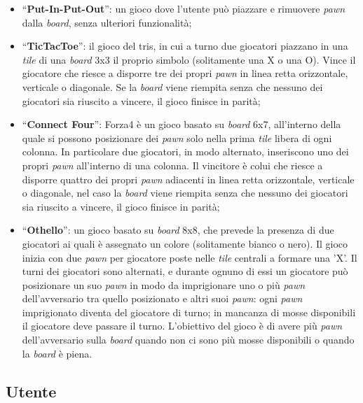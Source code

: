 \begin{itemize}
    \item ``\textbf{Put-In-Put-Out}'': un gioco dove l'utente può piazzare e rimuovere \textit{pawn} dalla \textit{board}, senza ulteriori funzionalità;
    \item ``\textbf{TicTacToe}'': il gioco del tris, in cui a turno due giocatori piazzano in una \textit{tile} di una \textit{board} 3x3 il proprio simbolo (solitamente una X o una O). Vince il giocatore che riesce a disporre tre dei propri \textit{pawn} in linea retta orizzontale, verticale o diagonale. Se la \textit{board} viene riempita senza che nessuno dei giocatori sia riuscito a vincere, il gioco finisce in parità;
    \item ``\textbf{Connect Four}'': Forza4 è un gioco basato su \textit{board} 6x7, all'interno della quale si possono posizionare dei \textit{pawn} solo nella prima \textit{tile} libera di ogni colonna. In particolare due giocatori, in modo alternato, inseriscono uno dei propri \textit{pawn} all'interno di una colonna. Il vincitore è colui che riesce a disporre quattro dei propri \textit{pawn} adiacenti in linea retta orizzontale, verticale o diagonale, nel caso la \textit{board} viene riempita senza che nessuno dei giocatori sia riuscito a vincere, il gioco finisce in parità;
    \item ``\textbf{Othello}'': un gioco basato su \textit{board} 8x8, che prevede la presenza di due giocatori ai quali è assegnato un colore (solitamente bianco o nero). Il gioco inizia con due \textit{pawn} per giocatore poste nelle \textit{tile} centrali a formare una 'X'. Il turni dei giocatori sono alternati, e durante ognuno di essi un giocatore può posizionare un suo \textit{pawn} in modo da imprigionare uno o più \textit{pawn} dell'avversario tra quello posizionato e altri suoi \textit{pawn}: ogni \textit{pawn} imprigionato diventa del giocatore di turno; in mancanza di mosse disponibili il giocatore deve passare il turno. L'obiettivo del gioco è di avere più \textit{pawn} dell'avversario sulla \textit{board} quando non ci sono più mosse disponibili o quando la \textit{board} è piena.
\end{itemize}

\subsection{Utente}

